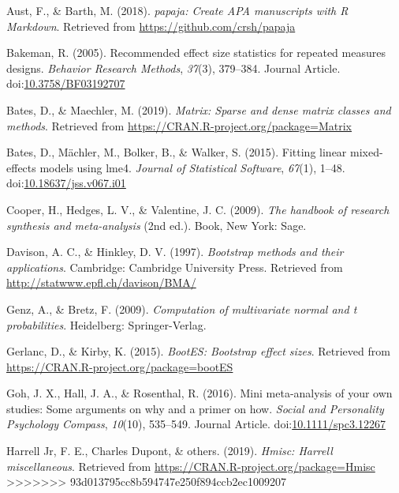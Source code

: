 \documentclass[
  man]{apa6}
\begin{document}
\begingroup
\setlength{\parindent}{-0.5in}
\setlength{\leftskip}{0.5in}

\hypertarget{refs}{}
\leavevmode\hypertarget{ref-R-papaja}{}%
Aust, F., \& Barth, M. (2018). \emph{papaja: Create APA manuscripts with R Markdown}. Retrieved from \url{https://github.com/crsh/papaja}

\leavevmode\hypertarget{ref-Bakeman_2015_eff_size}{}%
Bakeman, R. (2005). Recommended effect size statistics for repeated measures designs. \emph{Behavior Research Methods}, \emph{37}(3), 379--384. Journal Article. doi:\href{https://doi.org/10.3758/BF03192707}{10.3758/BF03192707}

\leavevmode\hypertarget{ref-R-Matrix}{}%
Bates, D., \& Maechler, M. (2019). \emph{Matrix: Sparse and dense matrix classes and methods}. Retrieved from \url{https://CRAN.R-project.org/package=Matrix}

\leavevmode\hypertarget{ref-R-lme4}{}%
Bates, D., Mächler, M., Bolker, B., \& Walker, S. (2015). Fitting linear mixed-effects models using lme4. \emph{Journal of Statistical Software}, \emph{67}(1), 1--48. doi:\href{https://doi.org/10.18637/jss.v067.i01}{10.18637/jss.v067.i01}

\leavevmode\hypertarget{ref-Cooper_2009_handbook}{}%
Cooper, H., Hedges, L. V., \& Valentine, J. C. (2009). \emph{The handbook of research synthesis and meta-analysis} (2nd ed.). Book, New York: Sage.

\leavevmode\hypertarget{ref-R-boot}{}%
Davison, A. C., \& Hinkley, D. V. (1997). \emph{Bootstrap methods and their applications}. Cambridge: Cambridge University Press. Retrieved from \url{http://statwww.epfl.ch/davison/BMA/}

\leavevmode\hypertarget{ref-R-mvtnorm}{}%
Genz, A., \& Bretz, F. (2009). \emph{Computation of multivariate normal and t probabilities}. Heidelberg: Springer-Verlag.

\leavevmode\hypertarget{ref-R-bootES}{}%
Gerlanc, D., \& Kirby, K. (2015). \emph{BootES: Bootstrap effect sizes}. Retrieved from \url{https://CRAN.R-project.org/package=bootES}

\leavevmode\hypertarget{ref-Goh_2016_mini}{}%
Goh, J. X., Hall, J. A., \& Rosenthal, R. (2016). Mini meta-analysis of your own studies: Some arguments on why and a primer on how. \emph{Social and Personality Psychology Compass}, \emph{10}(10), 535--549. Journal Article. doi:\href{https://doi.org/10.1111/spc3.12267}{10.1111/spc3.12267}

\leavevmode\hypertarget{ref-R-Hmisc}{}%
Harrell Jr, F. E., Charles Dupont, \& others. (2019). \emph{Hmisc: Harrell miscellaneous}. Retrieved from \url{https://CRAN.R-project.org/package=Hmisc}
>>>>>>> 93d013795cc8b594747e250f894ccb2ec1009207
\end{document}
